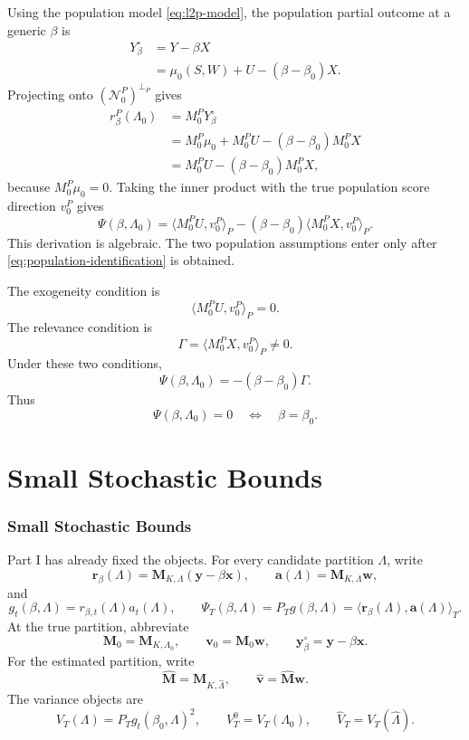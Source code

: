 \documentclass[12pt]{article}
\numberwithin{equation}{section}
\theoremstyle{definition}
\newcommand{\N}{\mathcal N}
\newcommand{\innerT}[2]{\langle #1,#2\rangle_T}
\newcommand{\innerP}[2]{\langle #1,#2\rangle_P}
\begin{document}
Using the population model \eqref{eq:l2p-model}, the population partial outcome
at a generic \(\beta\) is
\[
\begin{aligned}
    Y_\beta^\circ
    &=Y-\beta X \\
    &=\mu_0(S,W)+U-(\beta-\beta_0)X.
\end{aligned}
\]
Projecting onto \((\N_0^P)^{\perp_P}\) gives
\begin{equation}
\begin{aligned}
    r_\beta^P(\Lambda_0)
    &=M_0^PY_\beta^\circ \\
    &=M_0^P\mu_0+M_0^PU-(\beta-\beta_0)M_0^PX \\
    &=M_0^PU-(\beta-\beta_0)M_0^PX,
\end{aligned}
\label{eq:population-profiled-residual-identity}
\end{equation}
because \(M_0^P\mu_0=0\). Taking the inner product with the true population
score direction \(v_0^P\) gives
\begin{equation}
    \Psi(\beta,\Lambda_0)
    =\innerP{M_0^PU}{v_0^P}
     -(\beta-\beta_0)\innerP{M_0^PX}{v_0^P}.
    \label{eq:population-identification}
\end{equation}
This derivation is algebraic. The two population assumptions enter only after
\eqref{eq:population-identification} is obtained.

The exogeneity condition is
\[
    \innerP{M_0^PU}{v_0^P}=0.
\]
The relevance condition is
\[
    \Gamma=\innerP{M_0^PX}{v_0^P}\ne0.
\]
Under these two conditions,
\[
    \Psi(\beta,\Lambda_0)=-(\beta-\beta_0)\Gamma.
\]
Thus
\begin{equation}
    \Psi(\beta,\Lambda_0)=0
    \quad\Longleftrightarrow\quad
    \beta=\beta_0.
    \label{eq:unique-identification}
\end{equation}
\part{Small Stochastic Bounds}

\section{Small Stochastic Bounds}

Part I has already fixed the objects. For every candidate partition \(\Lambda\),
write
\[
    \bm r_\beta(\Lambda)=\bm M_{K,\Lambda}(\bm y-\beta\bm x),
    \qquad
    \bm a(\Lambda)=\bm M_{K,\Lambda}\bm w,
\]
and
\[
    g_t(\beta,\Lambda)=r_{\beta,t}(\Lambda)a_t(\Lambda),
    \qquad
    \Psi_T(\beta,\Lambda)=P_Tg(\beta,\Lambda)
    =\innerT{\bm r_\beta(\Lambda)}{\bm a(\Lambda)}.
\]
At the true partition, abbreviate
\[
    \bm M_0=\bm M_{K,\Lambda_0},
    \qquad
    \bm v_0=\bm M_0\bm w,
    \qquad
    \bm y_\beta^\circ=\bm y-\beta\bm x.
\]
For the estimated partition, write
\[
    \widehat{\bm M}=\bm M_{K,\widehat\Lambda},
    \qquad
    \widehat{\bm v}=\widehat{\bm M}\bm w.
\]
The variance objects are
\[
    V_T(\Lambda)=P_Tg_t(\beta_0,\Lambda)^2,
    \qquad
    V_T^0=V_T(\Lambda_0),
    \qquad
    \widehat V_T=V_T(\widehat\Lambda).
\]
\end{document}

